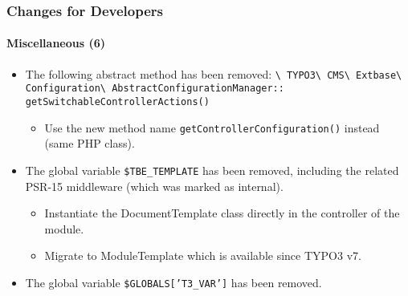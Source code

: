 \begin{frame}[fragile]
	\frametitle{Changes for Developers}
	\framesubtitle{Miscellaneous (6)}

	\begin{itemize}

		\item The following abstract method has been removed:\newline
			\smaller
				\texttt{\textbackslash
					TYPO3\textbackslash
					CMS\textbackslash
					Extbase\textbackslash
					Configuration\textbackslash
					AbstractConfigurationManager::}\newline
					\texttt{getSwitchableControllerActions()}
			\normalsize

			\begin{itemize}\smaller
				\item[\ding{228}] Use the new method name \texttt{getControllerConfiguration()} instead (same PHP class).
			\end{itemize}\normalsize

		\item The global variable \texttt{\$TBE\_TEMPLATE} has been removed, including
			the related PSR-15 middleware (which was marked as internal).

			\begin{itemize}\smaller
				\item[\ding{228}] Instantiate the DocumentTemplate class directly in the controller of the module.
				\item[\ding{228}] Migrate to ModuleTemplate which is available since TYPO3 v7.
			\end{itemize}\normalsize

		\item The global variable \texttt{\$GLOBALS['T3\_VAR']} has been removed.\newline

	\end{itemize}

\end{frame}

